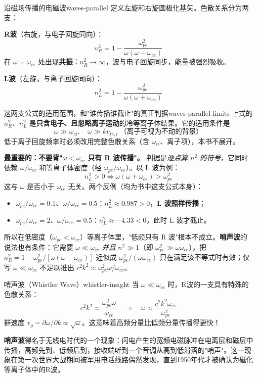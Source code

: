\documentclass[12pt,a4paper,openany,oneside]{book}
\begin{document}
\begin{theorem}{沿磁场传播的电磁波}{waves-parallel}
定义左旋和右旋圆极化基矢。色散关系分为两支：

\textbf{R波}（右旋，与电子回旋同向）：
\[
n_R^2 = 1 - \frac{\omega_{pe}^2}{\omega(\omega - \omega_{ce})}
\]
在 $\omega = \omega_{ce}$ 处出现\textbf{共振}：$n_R^2 \to \infty$，波与电子回旋同步，能量被强烈吸收。

\textbf{L波}（左旋，与离子回旋同向）：
\[
n_L^2 = 1 - \frac{\omega_{pe}^2}{\omega(\omega + \omega_{ce})}
\]
\end{theorem}

\begin{warning}{这两支公式的适用范围，和"谁传播谁截止"的真正判据}{waves-parallel-limits}
上式的 $n_R^2$、$n_L^2$ 是\textbf{只含电子、且忽略离子运动}的冷等离子体结果。它的适用条件是
\[
\omega \gg \omega_{ci}, \quad \omega \gg k v_{te,i}\;\text{（离子可视为不动的背景）}
\]
低于离子回旋频率时必须改用完整色散关系（含 $\omega_{ci}$、离子项），本书不展开。

\textbf{最重要的：不要背"$\omega<\omega_{ce}$ 只有 R 波传播"。} 判据是\emph{逐点算 $n^2$ 的符号}，它同时依赖 $\omega/\omega_{ce}$ 和等离子体密度（经 $\omega_{pe}/\omega_{ce}$）。以 L 波为例：
\[
n_L^2 > 0 \iff \omega(\omega+\omega_{ce}) > \omega_{pe}^2
\]
这与 $\omega$ 是否小于 $\omega_{ce}$ 无关。两个反例（均为书中这支公式本身）：
\begin{itemize}
\item $\omega_{pe}/\omega_{ce}=0.1$、$\omega/\omega_{ce}=0.5$：$n_L^2\approx0.987>0$，\textbf{L 波照样传播}；
\item $\omega_{pe}/\omega_{ce}=2$、$\omega/\omega_{ce}=0.5$：$n_L^2\approx-4.33<0$，此时 L 波才截止。
\end{itemize}
所以在低密度（$\omega_{pe}<\omega_{ce}$）等离子体里，"低频只有 R 波"根本不成立。\textbf{哨声波}的说法也有条件：它需要 $\omega\ll\omega_{ce}$ \emph{并且} $n^2\gg1$（即 $\omega_{pe}^2\gg\omega\omega_{ce}$），把 $n_R^2=1-\omega_{pe}^2/[\omega(\omega-\omega_{ce})]$ 近似成 $\omega_{pe}^2/(\omega\omega_{ce})$ 只在满足该不等式时有效；仅写 $\omega\ll\omega_{ce}$ 不足以推出 $c^2k^2\approx\omega_{pe}^2\omega/\omega_{ce}$。
\end{warning}

\begin{insight}{哨声波（Whistler Wave）}{whistler-insight}
当 $\omega \ll \omega_{ce}$ 时，R波的一支具有特殊的色散关系：
\[
c^2 k^2 \approx \frac{\omega_{pe}^2 \omega}{\omega_{ce}}
\quad\Rightarrow\quad
\omega \approx \frac{c^2 k^2 \omega_{ce}}{\omega_{pe}^2}
\]
群速度 $v_g = \partial\omega/\partial k \propto \sqrt{\omega}$。这意味着高频分量比低频分量传播得更快！

\textbf{哨声波}得名于无线电时代的一个现象：闪电产生的宽频电磁脉冲在电离层和磁层中传播，高频先到、低频后到，接收端听到一个音调从高到低滑落的"哨声"。这一现象在第一次世界大战期间被军用电话线路偶然发现，直到1950年代才被确认为磁化等离子体中的R波。
\end{insight}
\end{document}
